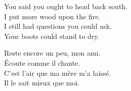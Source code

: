 \begin{lyrics}
You said you ought to head back south.\\
I put more wood upon the fire.\\
I still had questions you could ask.\\
Your boots could stand to dry.

Reste encore un peu, mon ami.\\
Écoute comme il chante.\\
C’est l’air que ma mère m’a laissé.\\
Il le sait mieux que moi.
\end{lyrics}

